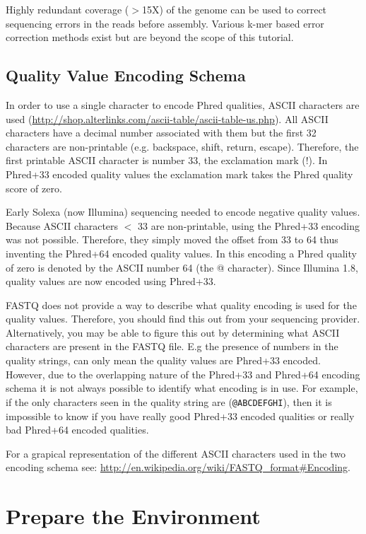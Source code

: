 Highly redundant coverage ($>$15X) of the genome can be used to correct sequencing
errors in the reads before assembly. Various k-mer based error
correction methods exist but are beyond the scope of this tutorial.

\subsection{Quality Value Encoding Schema}

In order to use a single character to encode Phred qualities, ASCII characters
are used (\url{http://shop.alterlinks.com/ascii-table/ascii-table-us.php}). All ASCII characters have a decimal
number associated with them but the first 32 characters are non-printable (e.g.
backspace, shift, return, escape). Therefore, the first printable ASCII   
character is number 33, the exclamation mark (!). In Phred+33 encoded quality
values the exclamation mark takes the Phred quality score of zero.

Early Solexa (now Illumina) sequencing needed to encode negative quality values.
Because ASCII characters $<$ 33 are non-printable, using the Phred+33 encoding was
not possible. Therefore, they simply moved the offset from 33 to 64 thus
inventing the Phred+64 encoded quality values. In this encoding a Phred quality
of zero is denoted by the ASCII number 64 (the @ character). Since Illumina 1.8,
quality values are now encoded using Phred+33.

FASTQ does not provide a way to describe what quality encoding is used for the
quality values. Therefore, you should find this out from your sequencing
provider. Alternatively, you may be able to figure this out by determining what
ASCII characters are present in the FASTQ file. E.g the presence of numbers in
the quality strings, can only mean the quality values are Phred+33 encoded.
However, due to the overlapping nature of the Phred+33 and Phred+64 encoding
schema it is not always possible to identify what encoding is in use. For
example, if the only characters seen in the quality string are (\texttt{@ABCDEFGHI}),
then it is impossible to know if you have really good Phred+33 encoded qualities
or really bad Phred+64 encoded qualities.

For a grapical representation of the different ASCII characters used in the two
encoding schema see: \url{http://en.wikipedia.org/wiki/FASTQ_format#Encoding}.

\section{Prepare the Environment}

